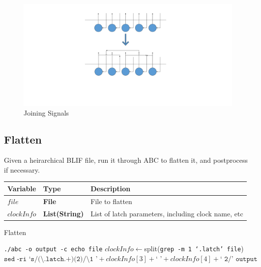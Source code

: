 \documentclass[12pt,final,oneside]{dwThesis} %
\begin{document}
   \begin{figure}

      \begin{center}

         \includegraphics*[viewport=500 230 1200 800,width=\linewidth]{images/Join.pdf}
         \caption{Joining Signals} \label{imJoin} 
      \end{center}

   \end{figure}


   \newpage 
   \subsection{Flatten}
   \label{algFlatten} Given a
   heirarchical \gls{BLIF} file, run it through
   \gls{ABC} to flatten it, and postprocess if
   necessary.  
   \begin{algorithm}

      \begin{center}


         \begin{tabularx}
            {\linewidth}{llX} \toprule Variable & Type &
            Description\\
            \midrule $file$ &\textbf{File } &  File to
            flatten\\
            $clockInfo$ & \textbf{List(String)} & List of latch parameters, including clock name, etc\\
            \bottomrule 
         \end{tabularx}

      \end{center}

      \caption{Flatten}\label{Flatten} 
      \begin{algorithmic}
         [1]
         \State \texttt{./abc -o output -c echo file}
         \State $clockInfo \gets $split(\texttt{grep -m 1 `.latch' file})
         \State $\texttt{sed -ri `s/(\textbackslash.latch.+)(2)/\textbackslash1 '} + clockInfo[3] + \texttt{` '} +
         clockInfo[4] + \texttt{` 2/' output} $\EndIf \EndProcedure 
      \end{algorithmic}


   \end{algorithm}
\end{document}

